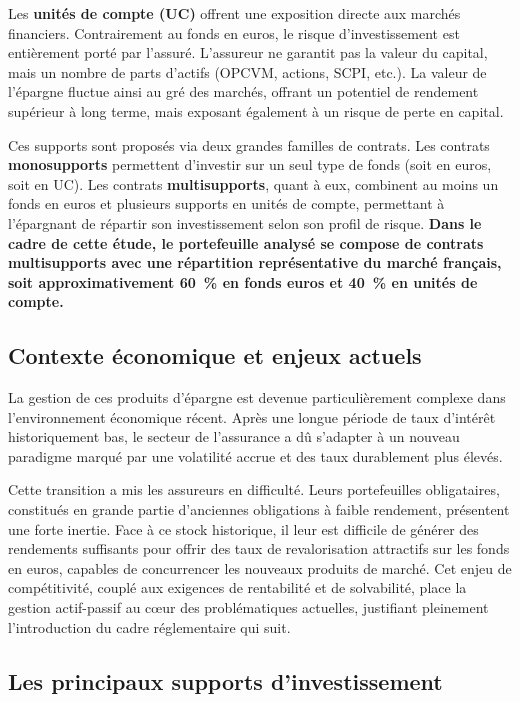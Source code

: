 \bigskip

Les \textbf{unités de compte (UC)} offrent une exposition directe aux marchés financiers. Contrairement au fonds en euros, le risque d'investissement est entièrement porté par l'assuré. L'assureur ne garantit pas la valeur du capital, mais un nombre de parts d'actifs (OPCVM, actions, SCPI, etc.). La valeur de l'épargne fluctue ainsi au gré des marchés, offrant un potentiel de rendement supérieur à long terme, mais exposant également à un risque de perte en capital.

\bigskip

Ces supports sont proposés via deux grandes familles de contrats. Les contrats \textbf{monosupports} permettent d'investir sur un seul type de fonds (soit en euros, soit en UC). Les contrats \textbf{multisupports}, quant à eux, combinent au moins un fonds en euros et plusieurs supports en unités de compte, permettant à l'épargnant de répartir son investissement selon son profil de risque.
\textbf{Dans le cadre de cette étude, le portefeuille analysé se compose de contrats multisupports avec une répartition représentative du marché français, soit approximativement 60~\% en fonds euros et 40~\% en unités de compte.}

\subsection{Contexte économique et enjeux actuels}

La gestion de ces produits d'épargne est devenue particulièrement complexe dans l'environnement économique récent. Après une longue période de taux d'intérêt historiquement bas, le secteur de l'assurance a dû s'adapter à un nouveau paradigme marqué par une volatilité accrue et des taux durablement plus élevés.

\bigskip

Cette transition a mis les assureurs en difficulté. Leurs portefeuilles obligataires, constitués en grande partie d'anciennes obligations à faible rendement, présentent une forte inertie. Face à ce stock historique, il leur est difficile de générer des rendements suffisants pour offrir des taux de revalorisation attractifs sur les fonds en euros, capables de concurrencer les nouveaux produits de marché. Cet enjeu de compétitivité, couplé aux exigences de rentabilité et de solvabilité, place la gestion actif-passif au cœur des problématiques actuelles, justifiant pleinement l'introduction du cadre réglementaire qui suit.

\subsection{Les principaux supports d'investissement}

